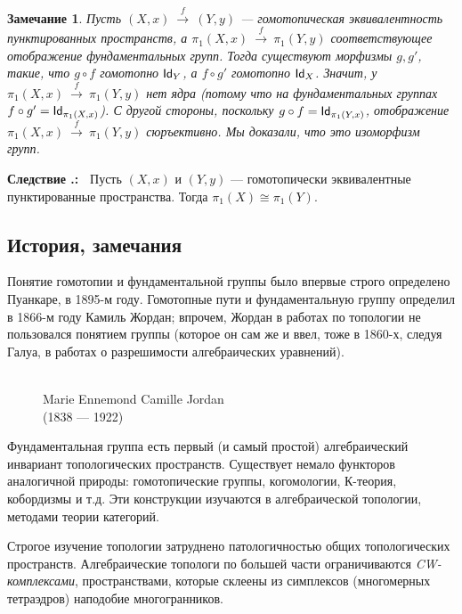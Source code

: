 \documentclass[12pt]{book}
\newcommand{\arrow}{{\:\longrightarrow\:}}
\def\Id{{\operatorname{\sf Id}}}
\theoremstyle{upshape}
\newtheorem{zadacha}{Задача}[chapter]
\theoremstyle{generic}
\newtheorem{remark}[teorema]{Замечание}
\def\замечание{\begin{remark}}
\def\еза{\end{remark}}
\theoremstyle{upshapenonumber}
\newcommand{\следствие}{%
     \refstepcounter{teorema}
     {\noindent\bf Следствие \thechapter.\arabic{teorema}:\ }}
\newcommand{\пример}{%
     \refstepcounter{teorema}
     {\noindent\bf Пример \thechapter.\arabic{teorema}:\ }}
\newcommand{\лемма}{%
     \refstepcounter{teorema}
     {\noindent\bf Лемма \thechapter.\arabic{teorema}:\ }}
\newcommand{\теорема}{%
     \refstepcounter{teorema}
     {\noindent\bf Теорема \thechapter.\arabic{teorema}:\ }}
\newcommand{\утверждение}{%
     \refstepcounter{teorema}
     {\noindent\bf Утверждение \thechapter.\arabic{teorema}:\ }}
\def\ем{\em}
\def\задача{\begin{zadacha}}
\def\ез{\end{zadacha}}
\def\еу{\end{ukazanie}}
\def\ео{\end{opredelenie}}
\def\енум{\begin{enumerate}}
\def\ее{\end{enumerate}}
\begin{document}
\замечание
Пусть  $(X,x) \stackrel f \arrow (Y,y)$ --- гомотопическая
эквивалентность пунктированных пространств, 
а $\pi_1(X,x) \stackrel f \arrow \pi_1(Y,y)$
соответствующее отображение фундаментальных групп.
Тогда существуют морфизмы $g, g'$, такие, что $g\circ f$ гомотопно
$\Id_Y$, а $f\circ g'$ гомотопно $\Id_X$. Значит,
у $\pi_1(X,x) \stackrel f \arrow \pi_1(Y,y)$ нет ядра
(потому что на фундаментальных группах 
$f\circ g'= \Id_{\pi_1(X,x)}$).
С другой стороны, поскольку $g\circ f=\Id_{\pi_1(Y,x)}$,
отображение
$\pi_1(X,x) \stackrel f \arrow \pi_1(Y,y)$ сюръективно.
Мы доказали, что это изоморфизм групп.
\еза

\следствие
Пусть $(X,x)$ и $(Y,y)$ --- гомотопически эквивалентные
пунктированные пространства. Тогда $\pi_1(X) \cong \pi_1(Y)$.





\subsection{История, замечания}


Понятие гомотопии и фундаментальной группы было 
впервые строго определено Пуанкаре, в 1895-м году. 
Гомотопные пути и фундаментальную группу 
определил в 1866-м году Камиль Жордан; впрочем, 
Жордан в работах по топологии не пользовался 
понятием группы (которое он сам же и ввел,
тоже в 1860-х, следуя Галуа, в работах 
о разрешимости алгебраических уравнений).



\begin{figure}[ht]
\begin{center}
\\
{Marie Ennemond Camille Jordan \\
(1838 --- 1922)}
\end{center}
\end{figure}



Фундаментальная группа есть первый (и самый простой)
алгебраический инвариант топологических пространств.
Существует немало функторов аналогичной природы:
гомотопические группы, когомологии, К-теория, кобордизмы 
и т.д.
Эти конструкции изучаются в алгебраической
топологии, методами теории категорий.

Строгое изучение топологии затруднено
патологичностью общих топологических пространств.
Алгебраические топологи по большей части ограничиваются
{\ем CW-комплексами}, пространствами, которые склеены 
из симплексов (многомерных тетраэдров)
наподобие многогранников. 
\end{document}
